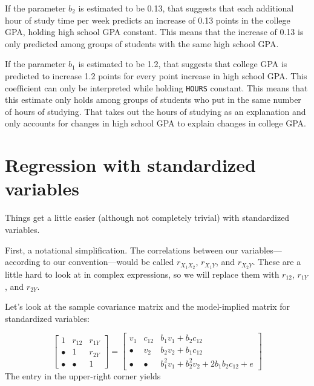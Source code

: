 \documentclass[
]{book}
\begin{document}
If the parameter \(b_{2}\) is estimated to be 0.13, that suggests that each additional hour of study time per week predicts an increase of 0.13 points in the college GPA, holding high school GPA constant. This means that the increase of 0.13 is only predicted among groups of students with the same high school GPA.

If the parameter \(b_{1}\) is estimated to be 1.2, that suggests that college GPA is predicted to increase 1.2 points for every point increase in high school GPA. This coefficient can only be interpreted while holding \texttt{HOURS} constant. This means that this estimate only holds among groups of students who put in the same number of hours of studying. That takes out the hours of studying as an explanation and only accounts for changes in high school GPA to explain changes in college GPA.

\hypertarget{multiple-standardized}{%
\section{Regression with standardized variables}\label{multiple-standardized}}

Things get a little easier (although not completely trivial) with standardized variables.

First, a notational simplification. The correlations between our variables---according to our convention---would be called \(r_{X_{1}X_{2}}\), \(r_{X_{1}Y}\), and \(r_{X_{2}Y}\). These are a little hard to look at in complex expressions, so we will replace them with \(r_{12}\), \(r_{1Y}\), and \(r_{2Y}\).

Let's look at the sample covariance matrix and the model-implied matrix for standardized variables:

\[
\begin{bmatrix}
1           &   r_{12}      &   r_{1Y} \\
\bullet     &   1           &   r_{2Y} \\
\bullet     &   \bullet     &   1
\end{bmatrix} = 
\begin{bmatrix}
v_{1}   &    c_{12}  &   b_{1} v_{1} + b_{2} c_{12} \\
\bullet &    v_{2}   &   b_{2} v_{2} + b_{1} c_{12} \\
\bullet &    \bullet &   b_{1}^{2} v_{1} + b_{2}^{2} v_{2} + 2b_{1}b_{2} c_{12} + e
\end{bmatrix}
\]
The entry in the upper-right corner yields
\end{document}
